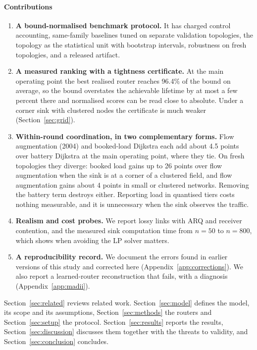 \paragraph{Contributions}
\begin{enumerate}[label=(C\arabic*), leftmargin=*]
  \item \textbf{A bound-normalised benchmark protocol.} It has charged control accounting, same-family baselines tuned on separate validation topologies, the topology as the statistical unit with bootstrap intervals, robustness on fresh topologies, and a released artifact.
  \item \textbf{A measured ranking with a tightness certificate.} At the main operating point the best realised router reaches 96.4\% of the bound on average, so the bound overstates the achievable lifetime by at most a few percent there and normalised scores can be read close to absolute. Under a corner sink with clustered nodes the certificate is much weaker (Section~\ref{sec:grid}).
  \item \textbf{Within-round coordination, in two complementary forms.} Flow augmentation (2004) and booked-load Dijkstra each add about 4.5 points over battery Dijkstra at the main operating point, where they tie. On fresh topologies they diverge: booked load gains up to 26 points over flow augmentation when the sink is at a corner of a clustered field, and flow augmentation gains about 4 points in small or clustered networks. Removing the battery term destroys either. Reporting load in quantised tiers costs nothing measurable, and it is unnecessary when the sink observes the traffic.
  \item \textbf{Realism and cost probes.} We report lossy links with ARQ and receiver contention, and the measured sink computation time from $n=50$ to $n=800$, which shows when avoiding the LP solver matters.
  \item \textbf{A reproducibility record.} We document the errors found in earlier versions of this study and corrected here (Appendix~\ref{app:corrections}). We also report a learned-router reconstruction that fails, with a diagnosis (Appendix~\ref{app:madii}).
\end{enumerate}

Section~\ref{sec:related} reviews related work. Section~\ref{sec:model} defines the model, its scope and its assumptions, Section~\ref{sec:methods} the routers and Section~\ref{sec:setup} the protocol. Section~\ref{sec:results} reports the results, Section~\ref{sec:discussion} discusses them together with the threats to validity, and Section~\ref{sec:conclusion} concludes.
